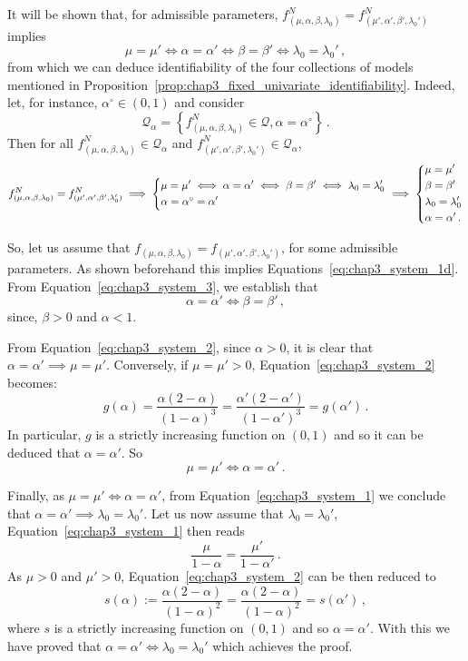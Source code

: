 \begin{subappendices}
  It will be shown that, for admissible parameters, $f_{(\mu, \alpha, \beta, \lambda_0)}^N = f_{(\mu', \alpha', \beta', \lambda_0')}^N$ implies \[\mu = \mu' \iff \alpha = \alpha' \iff \beta = \beta' \iff \lambda_0 = \lambda_0'\,,\]
  from which we can deduce identifiability of the four collections of models mentioned in Proposition~\ref{prop:chap3_fixed_univariate_identifiability}.
      Indeed, let, for instance, $\alpha^\circ \in (0, 1)$ and consider
  \[\mathcal{Q}_{\alpha} = \left\{f_{(\mu, \alpha, \beta, \lambda_0)}^N \in \mathcal{Q}, \alpha = \alpha^\circ \right\}\,.\]
  Then for all $f_{(\mu, \alpha, \beta, \lambda_0)}^N \in \mathcal Q_\alpha$ and $f_{(\mu', \alpha', \beta', \lambda_0')}^N \in \mathcal Q_\alpha$,
  \[
    f_{(\mu, \alpha, \beta, \lambda_0)}^N = f_{(\mu', \alpha', \beta', \lambda_0')}^N \implies 
  \begin{dcases}
  \mu = \mu' \iff \alpha = \alpha' \iff \beta = \beta' \iff \lambda_0 = \lambda_0'\\
  \alpha = \alpha^\circ = \alpha'
  \end{dcases} \implies
  \begin{dcases}
  \mu = \mu'\\
  \beta = \beta'\\
  \lambda_0=\lambda_0'\\
  \alpha = \alpha'\,.
  \end{dcases}
  \]
  
  So, let us assume that $f_{(\mu, \alpha, \beta, \lambda_0)} = f_{(\mu', \alpha', \beta', \lambda_0')}$,
  for some admissible parameters.
  As shown beforehand this implies Equations~\eqref{eq:chap3_system_1d}.
  From Equation~\eqref{eq:chap3_system_3}, we establish that \[\alpha = \alpha' \iff \beta = \beta'\,,\] since, $\beta > 0$ and $\alpha < 1$.
  
  From Equation~\eqref{eq:chap3_system_2}, since $\alpha > 0$, it is clear that $\alpha = \alpha' \implies \mu = \mu'$.  Conversely, if $\mu=\mu' > 0$, Equation~\eqref{eq:chap3_system_2} becomes:
  \[g(\alpha) =  \frac{\alpha (2-\alpha)}{(1-\alpha)^3} = \frac{\alpha' (2-\alpha')}{(1-\alpha')^3}  = g(\alpha')\,.\]
  In particular, $g$ is a strictly increasing function on $(0,1)$ and so it can be deduced that $\alpha = \alpha'$. So \[\mu = \mu' \iff \alpha = \alpha'\,.\]
  
  Finally, as $\mu = \mu' \iff \alpha = \alpha'$, from Equation~\eqref{eq:chap3_system_1} we conclude that $\alpha = \alpha' \implies \lambda_0 = \lambda_0'$. 
  Let us now assume that $\lambda_0 = \lambda_0'$, Equation~\eqref{eq:chap3_system_1} then reads \[\frac{\mu}{1-\alpha} = \frac{\mu'}{1-\alpha'}\,.\]
  As $\mu > 0$ and $\mu' > 0$, Equation~\eqref{eq:chap3_system_2} can be then reduced to \[s(\alpha) := \frac{\alpha(2-\alpha)}{(1-\alpha)^2} = \frac{\alpha(2-\alpha)}{(1-\alpha)^2} = s(\alpha')\,,\]
  where $s$ is a strictly increasing function on $(0,1)$ and so $\alpha = \alpha'$. With this we have proved that $\alpha = \alpha' \iff \lambda_0 = \lambda_0'$ which achieves the proof.







\end{subappendices}
